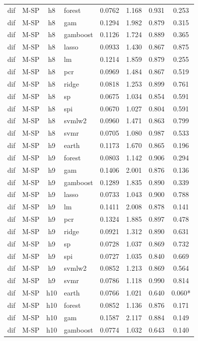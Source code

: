 \begin{ThreePartTable}
\begin{longtable}[t]{llclcccc}
dif & M-SP & h8 & forest & 0.0762 & 1.168 & 0.931 & 0.253\\
dif & M-SP & h8 & gam & 0.1294 & 1.982 & 0.879 & 0.315\\
dif & M-SP & h8 & gamboost & 0.1126 & 1.724 & 0.889 & 0.365\\
dif & M-SP & h8 & lasso & 0.0933 & 1.430 & 0.867 & 0.875\\
dif & M-SP & h8 & lm & 0.1214 & 1.859 & 0.879 & 0.255\\
dif & M-SP & h8 & pcr & 0.0969 & 1.484 & 0.867 & 0.519\\
dif & M-SP & h8 & ridge & 0.0818 & 1.253 & 0.899 & 0.761\\
dif & M-SP & h8 & sp & 0.0675 & 1.034 & 0.854 & 0.591\\
dif & M-SP & h8 & spi & 0.0670 & 1.027 & 0.804 & 0.591\\
dif & M-SP & h8 & svmlw2 & 0.0960 & 1.471 & 0.863 & 0.799\\
dif & M-SP & h8 & svmr & 0.0705 & 1.080 & 0.987 & 0.533\\
\addlinespace
dif & M-SP & h9 & earth & 0.1173 & 1.670 & 0.865 & 0.196\\
dif & M-SP & h9 & forest & 0.0803 & 1.142 & 0.906 & 0.294\\
dif & M-SP & h9 & gam & 0.1406 & 2.001 & 0.876 & 0.136\\
dif & M-SP & h9 & gamboost & 0.1289 & 1.835 & 0.890 & 0.339\\
dif & M-SP & h9 & lasso & 0.0733 & 1.043 & 0.900 & 0.788\\
dif & M-SP & h9 & lm & 0.1411 & 2.008 & 0.878 & 0.141\\
dif & M-SP & h9 & pcr & 0.1324 & 1.885 & 0.897 & 0.478\\
dif & M-SP & h9 & ridge & 0.0921 & 1.312 & 0.890 & 0.631\\
dif & M-SP & h9 & sp & 0.0728 & 1.037 & 0.869 & 0.732\\
dif & M-SP & h9 & spi & 0.0727 & 1.035 & 0.840 & 0.669\\
dif & M-SP & h9 & svmlw2 & 0.0852 & 1.213 & 0.869 & 0.564\\
dif & M-SP & h9 & svmr & 0.0786 & 1.118 & 0.990 & 0.814\\
\addlinespace
dif & M-SP & h10 & earth & 0.0766 & 1.021 & 0.640 & 0.060*\\
dif & M-SP & h10 & forest & 0.0852 & 1.136 & 0.876 & 0.171\\
dif & M-SP & h10 & gam & 0.1587 & 2.117 & 0.884 & 0.149\\
dif & M-SP & h10 & gamboost & 0.0774 & 1.032 & 0.643 & 0.140\\

\end{longtable}
\end{ThreePartTable}
